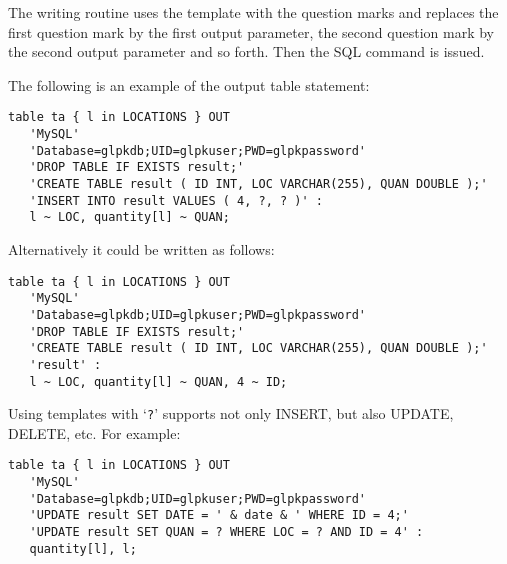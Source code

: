 \documentclass[11pt,draft]{article}
\begin{document}
The writing routine uses the template with the question marks and
replaces the first question mark by the first output parameter, the
second question mark by the second output parameter and so forth. Then
the SQL command is issued.

The following is an example of the output table statement:

\begin{small}
\begin{verbatim}
table ta { l in LOCATIONS } OUT
   'MySQL'
   'Database=glpkdb;UID=glpkuser;PWD=glpkpassword'
   'DROP TABLE IF EXISTS result;'
   'CREATE TABLE result ( ID INT, LOC VARCHAR(255), QUAN DOUBLE );'
   'INSERT INTO result VALUES ( 4, ?, ? )' :
   l ~ LOC, quantity[l] ~ QUAN;
\end{verbatim}
\end{small}

\noindent
Alternatively it could be written as follows:

\begin{small}
\begin{verbatim}
table ta { l in LOCATIONS } OUT
   'MySQL'
   'Database=glpkdb;UID=glpkuser;PWD=glpkpassword'
   'DROP TABLE IF EXISTS result;'
   'CREATE TABLE result ( ID INT, LOC VARCHAR(255), QUAN DOUBLE );'
   'result' :
   l ~ LOC, quantity[l] ~ QUAN, 4 ~ ID;
\end{verbatim}
\end{small}

Using templates with `\verb|?|' supports not only INSERT, but also
UPDATE, DELETE, etc. For example:

\begin{small}
\begin{verbatim}
table ta { l in LOCATIONS } OUT
   'MySQL'
   'Database=glpkdb;UID=glpkuser;PWD=glpkpassword'
   'UPDATE result SET DATE = ' & date & ' WHERE ID = 4;'
   'UPDATE result SET QUAN = ? WHERE LOC = ? AND ID = 4' :
   quantity[l], l;
\end{verbatim}
\end{small}

%
\end{document}

